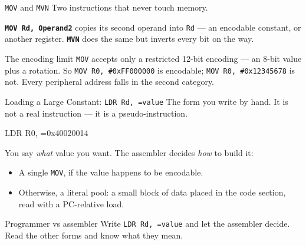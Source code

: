 \documentclass[9pt,aspectratio=169,xcolor=table]{beamer}
\begin{document}
\begin{frame}[fragile]{\texttt{MOV} and \texttt{MVN}}
    \leavevmode
    {\small Two instructions that never touch memory.}

    \vspace{2mm}
    {\small \textbf{\texttt{MOV Rd, Operand2}} copies its second operand
    into \texttt{Rd} --- an encodable constant, or another register.
    \textbf{\texttt{MVN}} does the same but inverts every bit on the way.}

    \vspace{2mm}
    \begin{center}
    \end{center}

    \vspace{2mm}
    \begin{block}{The encoding limit}
        \texttt{MOV} accepts only a restricted 12-bit encoding --- an 8-bit
        value plus a rotation. So \texttt{MOV R0, \#0xFF000000} is
        encodable; \texttt{MOV R0, \#0x12345678} is \alert{not}. Every
        peripheral address falls in the second category.
    \end{block}
\end{frame}

\begin{frame}[fragile]{Loading a Large Constant: \texttt{LDR Rd, =value}}
    \leavevmode
    {\small The form you write by hand. It is not a real instruction ---
    it is a \alert{pseudo-instruction}.}

    \vspace{2mm}
    \begin{center}
    \begin{asm}[basicstyle=\large\ttfamily]
LDR   R0, =0x40020014
\end{asm}
    \end{center}

    \vspace{3mm}
    {\small You say \emph{what} value you want. The assembler decides
    \emph{how} to build it:}

    \vspace{1mm}
    {\small
    \begin{itemize}\itemsep1pt
        \item A single \texttt{MOV}, if the value happens to be encodable.
        \item Otherwise, a \alert{literal pool}: a small block of data
              placed in the code section, read with a PC-relative load.
    \end{itemize}}

    \vspace{3mm}
    \begin{block}{Programmer vs assembler}
        Write \texttt{LDR Rd, =value} and let the assembler decide. Read
        the other forms and know what they mean.
    \end{block}
\end{frame}
\end{document}
